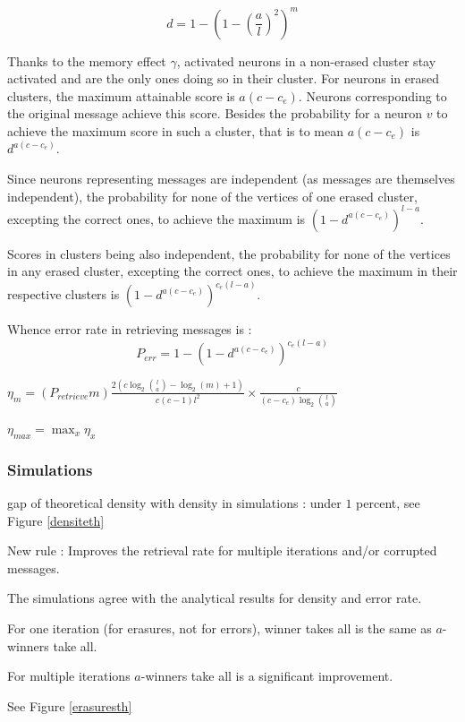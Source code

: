 \documentclass[english,11pt,twocolumn]{article}
\theoremstyle{definition}
\begin{document}
			
	\[ d = 1 - \left( 1 - \left(\frac{a}{l}\right)^2 \right)^m \]
	
	Thanks to the memory effect $\gamma$, activated neurons in a non-erased cluster stay activated and are the only ones doing so in their cluster. For neurons in erased clusters, the maximum attainable score is $a(c - c_e)$. Neurons corresponding to the original message achieve this score. Besides the probability for a neuron $v$ to achieve the maximum score in such a cluster, that is to mean $a(c-c_e)$ is $d^	{a(c-c_e)}$.
	
	
	Since neurons representing messages are independent (as messages are themselves independent), the probability for none of the vertices of one erased cluster, excepting the correct ones, to achieve the maximum is $\left(1 - d^	{a(c-c_e)}\right)^{l-a}$.
	
	Scores in clusters being also independent, the probability for none of the vertices in any erased cluster, excepting the correct ones, to achieve the maximum in their respective clusters is $\left(1 - d^	{a(c-c_e)}\right)^{c_e(l-a)}$.
	
	Whence error rate in retrieving messages is : \[P_{err} = 1 -	\left(1 - d^	{a(c-c_e)}\right)^{c_e(l-a)} \]
	
	
	$\eta_m = (P_{retrieve} m ) \frac{2 \left(c \log_2{l \choose a } - \log_2(m) + 1 \right)}{c(c-1)l^2} \times \frac{c}{(c-c_e) \log_2{l \choose a }}$
	
	$\eta_{max} = \max_x \eta_x $
	
	\subsubsection{Simulations}
		gap of theoretical density with density in simulations : under $1$ percent, see Figure \ref{densiteth}
		
		New rule : Improves the retrieval rate for multiple iterations and/or corrupted messages.
		
		The simulations agree with the analytical results for density and error rate.
	

	For one iteration (for erasures, not for errors), winner takes all is the same as $a$-winners take all.
	
	For multiple iterations $a$-winners take all is a significant improvement.
	
	See Figure \ref{erasuresth}	
	
\end{document}
